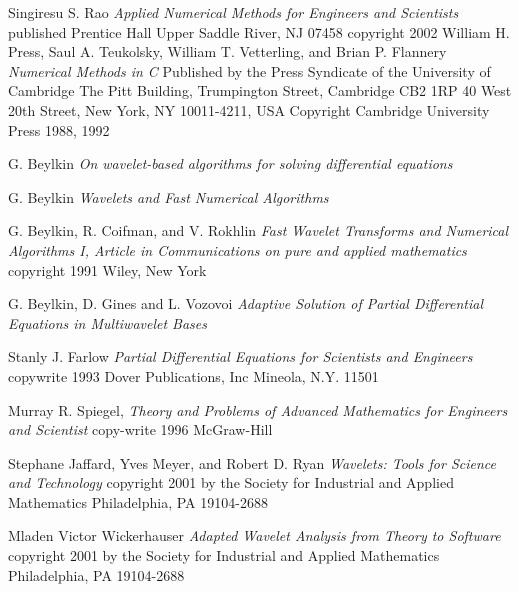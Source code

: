 \documentclass[11pt]{article}
\begin{document}
\begin{thebibliography}{99}
 Singiresu S. Rao \textsl{Applied Numerical Methods for Engineers and Scientists}  published Prentice Hall Upper Saddle River, NJ 07458 copyright  2002
 William H. Press, Saul A. Teukolsky, William T. Vetterling, and Brian P. Flannery 
\textsl {Numerical Methods in C}
Published by the Press Syndicate of the University of Cambridge The Pitt Building, Trumpington Street, Cambridge CB2 1RP
40 West 20th Street, New York, NY 10011-4211, USA
Copyright Cambridge University Press 1988, 1992

  G. Beylkin \textsl{On wavelet-based algorithms for solving differential equations}

  G. Beylkin \textsl{Wavelets and Fast Numerical Algorithms}

 G. Beylkin, R. Coifman, and V. Rokhlin \textsl {Fast Wavelet Transforms and Numerical Algorithms I, Article in Communications on pure and applied mathematics} copyright 1991 Wiley, New York

  G. Beylkin, D. Gines and L. Vozovoi \textsl{Adaptive Solution of Partial Differential Equations in Multiwavelet Bases }

 Stanly J. Farlow \textsl{Partial Differential Equations for Scientists and Engineers} copywrite 1993 Dover Publications, Inc Mineola, N.Y. 11501

 Murray R. Spiegel, \textsl { Theory and Problems of Advanced Mathematics for Engineers and Scientist} copy-write 1996 McGraw-Hill 

 Stephane Jaffard, Yves Meyer, and Robert D. Ryan \textsl {Wavelets: Tools for Science and Technology} copyright 2001 by the Society for Industrial and Applied Mathematics Philadelphia, PA 19104-2688

 Mladen Victor Wickerhauser \textsl {Adapted Wavelet Analysis from Theory to Software} copyright 2001 by the Society for Industrial and Applied Mathematics Philadelphia, PA 19104-2688


\end {thebibliography}


 
\end{document}
